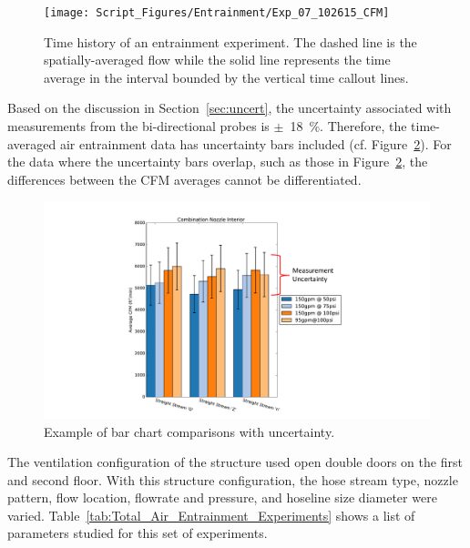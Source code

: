 \documentclass[12pt,oneside]{book}
\begin{document}
\begin{figure}[!ht]
\centering
\texttt{[image: Script\_Figures/Entrainment/Exp\_07\_102615\_CFM]} 
\caption[Time History of Entrainment Experiment]{Time history of an entrainment experiment. The dashed line is the spatially-averaged flow while the solid line represents the time average in the interval bounded by the vertical time callout lines.}
\label{fig:cfmplotexplainer}
\end{figure}

Based on the discussion in Section~\ref{sec:uncert}, the uncertainty associated with measurements from the bi-directional probes is $\pm$~18~\%. Therefore, the time-averaged air entrainment data has uncertainty bars included (cf. Figure~\ref{fig:cfmbarexplainer}). For the data where the uncertainty bars overlap, such as those in Figure~\ref{fig:cfmbarexplainer}, the differences between the CFM averages cannot be differentiated. 

\begin{figure}[!ht]
\centering
\includegraphics[width=.7\columnwidth]{Figures/Air_Entrainment/Total_Entrainment_Example} 
\caption[Average Flow Rate Comparison]{Example of bar chart comparisons with uncertainty.}
\label{fig:cfmbarexplainer}
\end{figure}

The  ventilation configuration of the structure used open double doors on the first and second floor. With this structure configuration, the hose stream type, nozzle pattern, flow location, flowrate and pressure, and hoseline size diameter were varied. Table~\ref{tab:Total_Air_Entrainment_Experiments} shows a list of parameters studied for this set of experiments.
\end{document}
